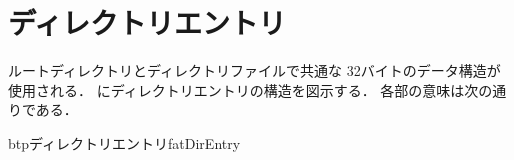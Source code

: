 \section{ディレクトリエントリ}
ルートディレクトリとディレクトリファイルで共通な
32バイトのデータ構造が使用される．
にディレクトリエントリの構造を図示する．
各部の意味は次の通りである．

\begin{myfig}{btp}{ディレクトリエントリ}{fatDirEntry}
\end{myfig}

